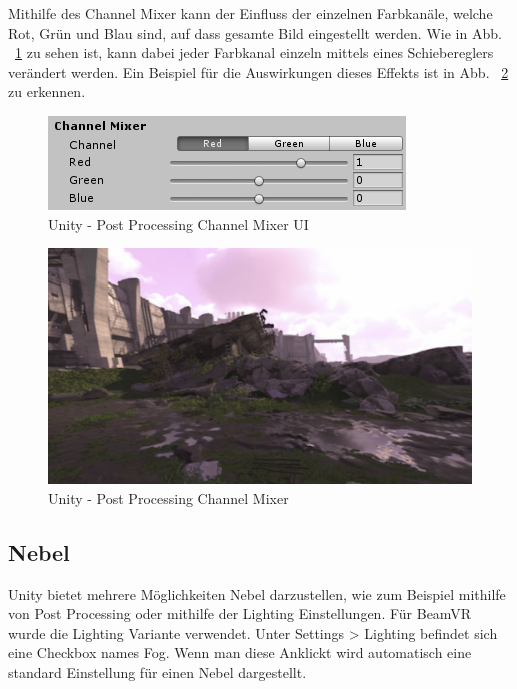 Mithilfe des Channel Mixer kann der Einfluss der einzelnen Farbkanäle, welche Rot, Grün und Blau sind, auf dass gesamte Bild eingestellt werden.
Wie in Abb. ~\ref{fig:unity-post-processing-channel-mixer-ui} zu sehen ist, kann dabei jeder Farbkanal einzeln mittels eines Schiebereglers verändert werden.
Ein Beispiel für die Auswirkungen dieses Effekts ist in Abb. ~\ref{fig:unity-post-processing-channel-mixer} zu erkennen.
\begin {figure}
    \centering
    \includegraphics[scale=0.9]{pics/unity-post-processing-channel-mixer-ui}
    \caption{Unity - Post Processing Channel Mixer UI}
    \label{fig:unity-post-processing-channel-mixer-ui}
\end {figure}

\begin {figure}
    \centering
    \includegraphics[scale=0.9]{pics/unity-post-processing-channel-mixer-example}
    \caption{Unity - Post Processing Channel Mixer}
    \label{fig:unity-post-processing-channel-mixer}
\end {figure}


\subsection{Nebel}\label{subsec:fog-effect}
Unity bietet mehrere M\"oglichkeiten Nebel darzustellen, wie zum Beispiel mithilfe von Post Processing oder mithilfe der Lighting Einstellungen.
F\"ur BeamVR wurde die Lighting Variante verwendet.
Unter Settings > Lighting befindet sich eine Checkbox names Fog.
Wenn man diese Anklickt wird automatisch eine standard Einstellung f\"ur einen Nebel dargestellt.
~\cite{Unity_Fog_2022}

